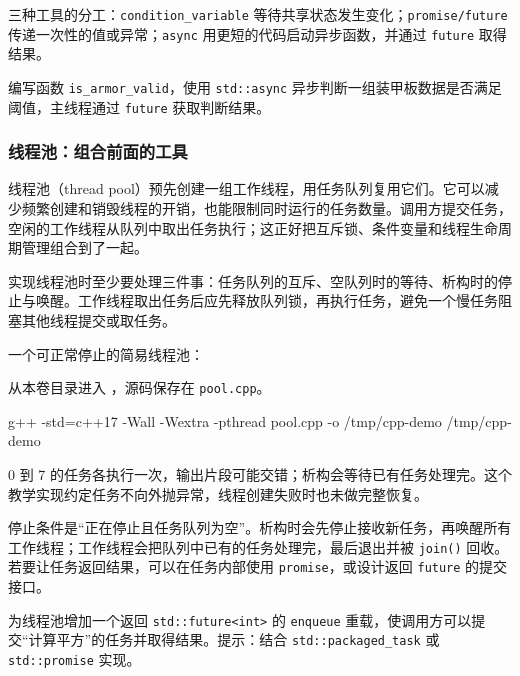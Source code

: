 \begin{conclusion}
三种工具的分工：\texttt{condition\_variable} 等待共享状态发生变化；\texttt{promise/future} 传递一次性的值或异常；\texttt{async} 用更短的代码启动异步函数，并通过 \texttt{future} 取得结果。
\end{conclusion}

\begin{exercise}\label{ex:v1-cpp-async}

编写函数 \texttt{is\_armor\_valid}，使用 \texttt{std::async} 异步判断一组装甲板数据是否满足阈值，主线程通过 \texttt{future} 获取判断结果。
\end{exercise}

\subsubsection{线程池：组合前面的工具}
线程池（thread pool）预先创建一组工作线程，用任务队列复用它们。它可以减少频繁创建和销毁线程的开销，也能限制同时运行的任务数量。调用方提交任务，空闲的工作线程从队列中取出任务执行；这正好把互斥锁、条件变量和线程生命周期管理组合到了一起。

实现线程池时至少要处理三件事：任务队列的互斥、空队列时的等待、析构时的停止与唤醒。工作线程取出任务后应先释放队列锁，再执行任务，避免一个慢任务阻塞其他线程提交或取任务。

\begin{example}
一个可正常停止的简易线程池：



从本卷目录进入 ，源码保存在 \texttt{pool.cpp}。
\begin{tbash}
g++ -std=c++17 -Wall -Wextra -pthread pool.cpp -o /tmp/cpp-demo
/tmp/cpp-demo
\end{tbash}
0 到 7 的任务各执行一次，输出片段可能交错；析构会等待已有任务处理完。这个教学实现约定任务不向外抛异常，线程创建失败时也未做完整恢复。
\end{example}

停止条件是“正在停止且任务队列为空”。析构时会先停止接收新任务，再唤醒所有工作线程；工作线程会把队列中已有的任务处理完，最后退出并被 \texttt{join()} 回收。若要让任务返回结果，可以在任务内部使用 \texttt{promise}，或设计返回 \texttt{future} 的提交接口。

\begin{exercise}\label{ex:v1-cpp-pool}

为线程池增加一个返回 \texttt{std::future<int>} 的 \texttt{enqueue} 重载，使调用方可以提交“计算平方”的任务并取得结果。提示：结合 \texttt{std::packaged\_task} 或 \texttt{std::promise} 实现。
\end{exercise}

